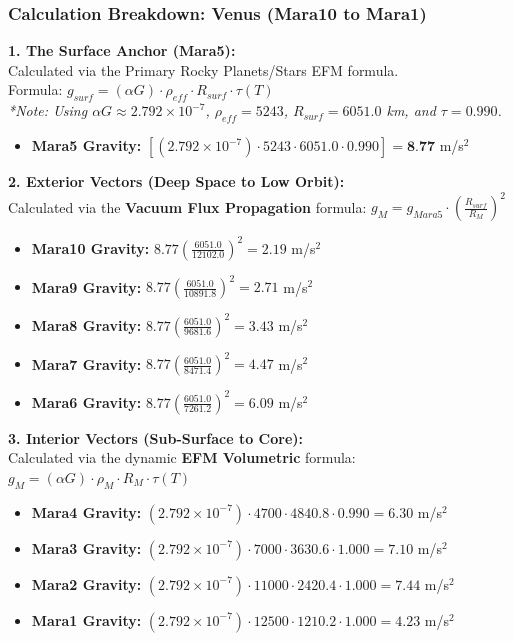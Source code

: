 \documentclass[11pt, a4paper]{article}
\begin{document}
\clearpage
\subsubsection{Calculation Breakdown: Venus (Mara10 to Mara1)}

\noindent \textbf{1. The Surface Anchor (Mara5):} \\
Calculated via the Primary Rocky Planets/Stars EFM formula. \\
Formula: $g_{surf} = (\alpha G) \cdot \rho_{eff} \cdot R_{surf} \cdot \tau(T)$ \\
\textit{*Note: Using $\alpha G \approx 2.792 \times 10^{-7}$, $\rho_{eff} = 5243$, $R_{surf} = 6051.0$ km, and $\tau = 0.990$.}
\begin{itemize}
  \item \textbf{Mara5 Gravity:} $\left[ (2.792 \times 10^{-7}) \cdot 5243 \cdot 6051.0 \cdot 0.990 \right] = \textbf{8.77}$ m/s$^2$
\end{itemize}

\vspace{0.5em}
\noindent \textbf{2. Exterior Vectors (Deep Space to Low Orbit):} \\
Calculated via the \textbf{Vacuum Flux Propagation} formula: $g_M = g_{Mara5} \cdot \left( \frac{R_{surf}}{R_M} \right)^2$
\begin{itemize}
  \item \textbf{Mara10 Gravity:} $8.77 \left( \frac{6051.0}{12102.0} \right)^2 = 2.19$ m/s$^2$
  \item \textbf{Mara9 Gravity:} $8.77 \left( \frac{6051.0}{10891.8} \right)^2 = 2.71$ m/s$^2$
  \item \textbf{Mara8 Gravity:} $8.77 \left( \frac{6051.0}{9681.6} \right)^2 = 3.43$ m/s$^2$
  \item \textbf{Mara7 Gravity:} $8.77 \left( \frac{6051.0}{8471.4} \right)^2 = 4.47$ m/s$^2$
  \item \textbf{Mara6 Gravity:} $8.77 \left( \frac{6051.0}{7261.2} \right)^2 = 6.09$ m/s$^2$
\end{itemize}

\vspace{0.5em}
\noindent \textbf{3. Interior Vectors (Sub-Surface to Core):} \\
Calculated via the dynamic \textbf{EFM Volumetric} formula: $g_M = (\alpha G) \cdot \rho_{M} \cdot R_M \cdot \tau(T)$
\begin{itemize}
  \item \textbf{Mara4 Gravity:} $(2.792 \times 10^{-7}) \cdot 4700 \cdot 4840.8 \cdot 0.990 = 6.30$ m/s$^2$
  \item \textbf{Mara3 Gravity:} $(2.792 \times 10^{-7}) \cdot 7000 \cdot 3630.6 \cdot 1.000 = 7.10$ m/s$^2$
  \item \textbf{Mara2 Gravity:} $(2.792 \times 10^{-7}) \cdot 11000 \cdot 2420.4 \cdot 1.000 = 7.44$ m/s$^2$
  \item \textbf{Mara1 Gravity:} $(2.792 \times 10^{-7}) \cdot 12500 \cdot 1210.2 \cdot 1.000 = 4.23$ m/s$^2$
\end{itemize}
\end{document}
